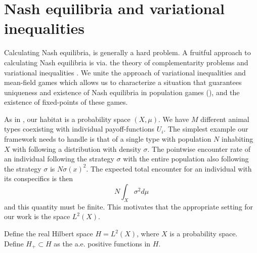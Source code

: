 \section{Nash equilibria and variational inequalities}
Calculating Nash equilibria,  is generally a hard problem. A fruitful approach to calculating Nash equilibria is via. the theory of complementarity problems and variational inequalities \citep{karamardian1969nonlinear,nabetani2011parametrized}. We unite the approach of variational inequalities and mean-field games which allows us to characterize a situation that guarantees uniqueness and existence of Nash equilibria in population games (), and the existence of fixed-points of these games.


As in , our habitat is a probability space $(X,\mu)$. We have $M$ different animal types coexisting with individual payoff-functions $U_i$. The simplest example our framework needs to handle is that of a single type with population $N$ inhabiting $X$ with following a distribution with density $\sigma$. The pointwise encounter rate of an individual following the strategy $\sigma$ with the entire population also following the strategy $\sigma$ is $N\sigma(x)^2$. The expected total encounter for an individual with its conspecifics is then
\begin{equation}
  N\int_X \sigma^2 d\mu
\end{equation}
and this quantity must be finite. This motivates that the appropriate setting for our work is the space $L^2(X)$.
\begin{definition}
  Define the real Hilbert space $H=L^2(X)$, where $X$ is a probability space. Define $H_+ \subset H$ as the a.e. positive functions in $H$.
\end{definition}

